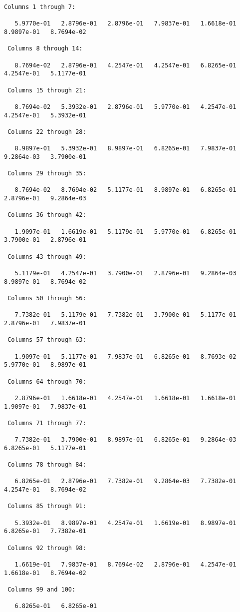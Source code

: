 \documentclass[10pt]{article}
\begin{document}
\begin{lstlisting}[language={},xleftmargin=5pt,frame=none]
 Columns 1 through 7:
 
   5.9770e-01   2.8796e-01   2.8796e-01   7.9837e-01   1.6618e-01   8.9897e-01   8.7694e-02
 
 Columns 8 through 14:
 
   8.7694e-02   2.8796e-01   4.2547e-01   4.2547e-01   6.8265e-01   4.2547e-01   5.1177e-01
 
 Columns 15 through 21:
 
   8.7694e-02   5.3932e-01   2.8796e-01   5.9770e-01   4.2547e-01   4.2547e-01   5.3932e-01
 
 Columns 22 through 28:
 
   8.9897e-01   5.3932e-01   8.9897e-01   6.8265e-01   7.9837e-01   9.2864e-03   3.7900e-01
 
 Columns 29 through 35:
 
   8.7694e-02   8.7694e-02   5.1177e-01   8.9897e-01   6.8265e-01   2.8796e-01   9.2864e-03
 
 Columns 36 through 42:
 
   1.9097e-01   1.6619e-01   5.1179e-01   5.9770e-01   6.8265e-01   3.7900e-01   2.8796e-01
 
 Columns 43 through 49:
 
   5.1179e-01   4.2547e-01   3.7900e-01   2.8796e-01   9.2864e-03   8.9897e-01   8.7694e-02
 
 Columns 50 through 56:
 
   7.7382e-01   5.1179e-01   7.7382e-01   3.7900e-01   5.1177e-01   2.8796e-01   7.9837e-01
 
 Columns 57 through 63:
 
   1.9097e-01   5.1177e-01   7.9837e-01   6.8265e-01   8.7693e-02   5.9770e-01   8.9897e-01
 
 Columns 64 through 70:
 
   2.8796e-01   1.6618e-01   4.2547e-01   1.6618e-01   1.6618e-01   1.9097e-01   7.9837e-01
 
 Columns 71 through 77:
 
   7.7382e-01   3.7900e-01   8.9897e-01   6.8265e-01   9.2864e-03   6.8265e-01   5.1177e-01
 
 Columns 78 through 84:
 
   6.8265e-01   2.8796e-01   7.7382e-01   9.2864e-03   7.7382e-01   4.2547e-01   8.7694e-02
 
 Columns 85 through 91:
 
   5.3932e-01   8.9897e-01   4.2547e-01   1.6619e-01   8.9897e-01   6.8265e-01   7.7382e-01
 
 Columns 92 through 98:
 
   1.6619e-01   7.9837e-01   8.7694e-02   2.8796e-01   4.2547e-01   1.6618e-01   8.7694e-02
 
 Columns 99 and 100:
 
   6.8265e-01   6.8265e-01

\end{lstlisting}
\end{document}
